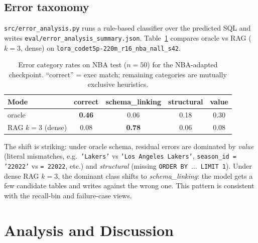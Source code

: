 \documentclass[11pt,a4paper]{article}
\newcommand{\bestckpt}{\texttt{lora\_codet5p-220m\_r16\_nba\_nall\_s42}}
\begin{document}
\subsection{Error taxonomy}
\label{sec:errors}

\texttt{src/error\_analysis.py} runs a rule-based classifier over the
predicted SQL and writes \texttt{eval/error\_analysis\_summary.json}.
Table~\ref{tab:errors} compares oracle vs RAG ($k=3$, dense) on \bestckpt{}.

\begin{table}[h]
\centering
\caption{Error category rates on NBA test ($n{=}50$) for the NBA-adapted
checkpoint. ``correct'' = exec match; remaining categories are mutually
exclusive heuristics.}
\label{tab:errors}
\small
\begin{tabular}{l c c c c}
\toprule
Mode & correct & schema\_linking & structural & value \\
\midrule
oracle  & \textbf{0.46} & 0.06 & 0.18 & 0.30 \\
RAG $k{=}3$ (dense) & 0.08 & \textbf{0.78} & 0.06 & 0.08 \\
\bottomrule
\end{tabular}
\end{table}

The shift is striking: under oracle schema, residual errors are dominated by
\emph{value} (literal mismatches, e.g.\ \texttt{'Lakers'} vs
\texttt{'Los Angeles Lakers'}, \texttt{season\_id = '22022'} vs
\texttt{= 22022}, etc.) and \emph{structural} (missing
\texttt{ORDER BY $\dots$ LIMIT 1}). Under dense RAG $k{=}3$, the dominant
class shifts to \emph{schema\_linking}: the model gets a few candidate tables
and writes against the wrong one. This pattern is consistent with the
recall-bin and failure-case views.

\section{Analysis and Discussion}
\label{sec:analysis}
\end{document}
